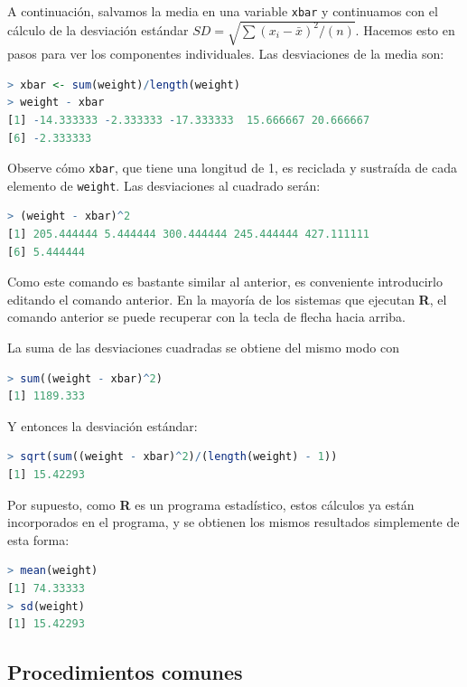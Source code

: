 \documentclass[spanish]{extbook}
\numberwithin{equation}{section}
\numberwithin{figure}{section}
\begin{document}
A continuación, salvamos la media en una variable \texttt{xbar} y continuamos
con el cálculo de la desviación estándar $SD = \sqrt{\sum (x_i -\bar{x})^2/(n)}$. 
Hacemos esto en pasos para ver los componentes individuales. Las desviaciones 
de la media son: 

\begin{lstlisting}[language=R]
> xbar <- sum(weight)/length(weight)
> weight - xbar
[1] -14.333333 -2.333333 -17.333333  15.666667 20.666667
[6] -2.333333 
\end{lstlisting}

Observe cómo \texttt{xbar}, que tiene una longitud de 1, es reciclada y
sustraída de cada elemento de \texttt{weight}. Las desviaciones al cuadrado
serán:

\begin{lstlisting}[language=R]
> (weight - xbar)^2
[1] 205.444444 5.444444 300.444444 245.444444 427.111111
[6] 5.444444
\end{lstlisting}

Como este comando es bastante similar al anterior, es conveniente introducirlo
editando el comando anterior. En la mayoría de los sistemas que ejecutan
\textbf{R}, el comando anterior se puede recuperar con la tecla de flecha hacia
arriba. 

La suma de las desviaciones cuadradas se obtiene del mismo modo con

\begin{lstlisting}[language=R]
> sum((weight - xbar)^2)
[1] 1189.333
\end{lstlisting}

Y entonces la desviación estándar:

\begin{lstlisting}[language=R]
> sqrt(sum((weight - xbar)^2)/(length(weight) - 1))
[1] 15.42293
\end{lstlisting}

Por supuesto, como \textbf{R} es un programa estadístico, estos cálculos ya
están incorporados en el programa, y se obtienen los mismos resultados
simplemente de esta forma:

\begin{lstlisting}[language=R]
> mean(weight)
[1] 74.33333
> sd(weight)
[1] 15.42293
\end{lstlisting}

\subsection{Procedimientos comunes}
\end{document}
